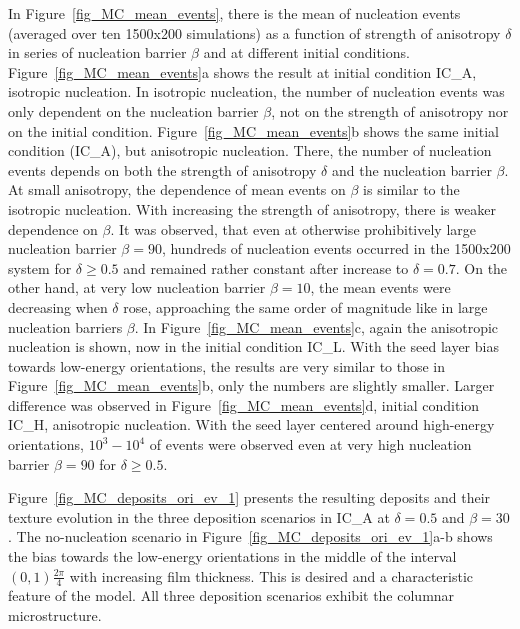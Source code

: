 In Figure~\ref{fig_MC_mean_events}, there is the mean of nucleation events (averaged over ten 1500x200 simulations) as a function of strength of anisotropy $\delta$ in series of nucleation barrier $\beta$ and at different initial conditions. Figure~\ref{fig_MC_mean_events}a shows the result at initial condition IC\_A, isotropic nucleation. In isotropic nucleation, the number of nucleation events was only dependent on the nucleation barrier $\beta$, not on the strength of anisotropy nor on the initial condition. Figure~\ref{fig_MC_mean_events}b shows the same initial condition (IC\_A), but anisotropic nucleation. There, the number of nucleation events depends on both the strength of anisotropy $\delta$ and the nucleation barrier $\beta$. At small anisotropy, the dependence of mean events on $\beta$ is similar to the isotropic nucleation. With increasing the strength of anisotropy, there is weaker dependence on $\beta$. It was observed, that even at otherwise prohibitively large nucleation barrier $\beta=90$, hundreds of nucleation events occurred in the 1500x200 system for $\delta\geq 0.5$ and remained rather constant after increase to $\delta=0.7$. On the other hand, at very low nucleation barrier $\beta=10$, the mean events were decreasing when $\delta$ rose, approaching the same order of magnitude like in large nucleation barriers $\beta$. In Figure~\ref{fig_MC_mean_events}c, again the anisotropic nucleation is shown, now in the initial condition IC\_L. With the seed layer bias towards low-energy orientations, the results are very similar to those in Figure~\ref{fig_MC_mean_events}b, only the numbers are slightly smaller. Larger difference was observed in Figure~\ref{fig_MC_mean_events}d, initial condition IC\_H, anisotropic nucleation. With the seed layer centered around high-energy orientations, $10^3-10^4$ of events were observed even at very high nucleation barrier $\beta=90$ for $\delta \geq 0.5$.

Figure~\ref{fig_MC_deposits_ori_ev_1} presents the resulting deposits and their texture evolution in the three deposition scenarios in IC\_A at $\delta=0.5$ and $\beta=30$. The no-nucleation scenario in Figure~\ref{fig_MC_deposits_ori_ev_1}a-b shows the bias towards the low-energy orientations in the middle of the interval $(0,1)\frac{2\pi}{4}$ with increasing film thickness. This is desired and a characteristic feature of the model. All three deposition scenarios exhibit the columnar microstructure.

